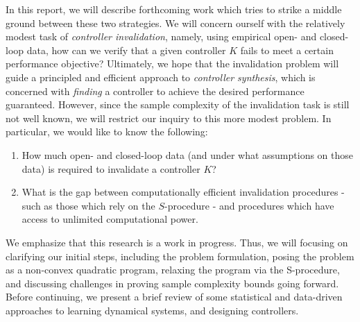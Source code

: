\documentclass[11pt]{article} %
\theoremstyle{plain}
\theoremstyle{definition}
\theoremstyle{remark}
\begin{document}
In this report, we will describe forthcoming work which tries to strike a middle ground between these two strategies. We will concern ourself with the relatively modest task of \emph{controller invalidation}, namely, using empirical open- and closed-loop data, how can we verify that a given controller $K$ fails to meet a certain performance objective? Ultimately, we hope that the invalidation problem will guide a principled and efficient approach to \emph{controller synthesis}, which is concerned with \emph{finding} a controller to achieve the desired performance guaranteed. However, since the sample complexity of the invalidation task is still not well known, we will restrict our inquiry to this more modest problem. In particular, we would like to know the following:
\begin{enumerate}
	\item How much open- and closed-loop data (and under what assumptions on those data) is required to invalidate a controller $K$? 
	\item What is the gap between computationally efficient invalidation procedures - such as those which rely on the $S$-procedure - and procedures which have access to unlimited computational power. 
\end{enumerate} 
We emphasize that this research is a work in progress. Thus, we will focusing on clarifying our initial steps, including the problem formulation, posing the problem as a non-convex quadratic program, relaxing the program via the S-procedure, and discussing challenges in proving sample complexity bounds going forward. Before continuing, we present a brief review of some statistical and data-driven approaches to learning dynamical systems, and designing controllers.
\end{document}
